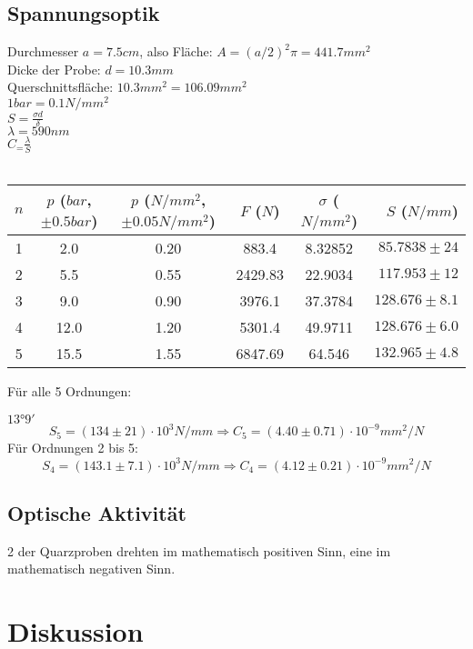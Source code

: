 \documentclass{article}
\begin{document}
\subsection{Spannungsoptik}
Durchmesser $a=7.5cm$, also Fläche: $A=(a/2)^2\pi=441.7mm^2$\\
Dicke der Probe: $d=10.3mm$\\
Querschnittsfläche: $10.3mm^2=106.09mm^2$\\
$1 bar = 0.1 N/mm^2$\\
$S=\frac{\sigma d}{\delta}$\\
$\lambda=590nm$\\
$C_=\frac{\lambda}{S}$\\
\\
\begin{table}[H]
\begin{center}
\begin{tabular}{|c|c|c|c|c|r|}
\hline
$n$ & $p$ ($\si{bar}$, $\pm 0.5 bar$) & $p$ ($N/mm^2$, $\pm 0.05N/mm^2$) & $F$ ($N$) & $\sigma$ ($N/mm^2$) & $S$ ($N/mm$)\\
\hline
1 & 2.0 & 0.20 & 883.4 & 8.32852 & $85.7838 \pm 24$\\
2 & 5.5 & 0.55 & 2429.83 & 22.9034 & $117.953 \pm 12$\\
3 & 9.0 & 0.90 & 3976.1 & 37.3784 & $128.676 \pm 8.1$\\
4 & 12.0 & 1.20 & 5301.4 & 49.9711 & $128.676 \pm 6.0$\\
5 & 15.5 & 1.55 & 6847.69 & 64.546 & $132.965 \pm 4.8$\\
\hline
\end{tabular}
\end{center}
\end{table}
\vspace{0.5mm}
Für alle 5 Ordnungen:

$13°9'$
$$S_5=(134 \pm 21 )\cdot 10^3 N/mm \Rightarrow C_5=(4.40 \pm 0.71) \cdot 10^{-9}mm^2/N$$
Für Ordnungen 2 bis 5:
$$S_4=(143.1 \pm 7.1 )\cdot 10^3 N/mm \Rightarrow C_4=(4.12 \pm 0.21) \cdot 10^{-9}mm^2/N$$

\subsection{Optische Aktivität}
2 der Quarzproben drehten im mathematisch positiven Sinn, eine im mathematisch negativen Sinn.\\


\section{Diskussion}
\end{document}
